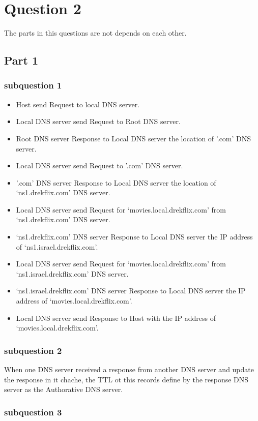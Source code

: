 \documentclass{article}
\begin{document}
\section{Question 2}
The parts in this questions are not depends on each other.
\subsection{Part 1}
\subsubsection{subquestion 1}
\begin{itemize}
    \item Host send Request to local DNS server.
    \item Local DNS server send Request to Root DNS server.
    \item Root DNS server Response to Local DNS server the location of '.com' DNS server.
    \item Local DNS server send Request to '.com' DNS server.
    \item '.com' DNS server Response to Local DNS server the location of `ns1.drekflix.com' DNS server.
    \item Local DNS server send Request for `movies.local.drekflix.com' from `ns1.drekflix.com' DNS server.
    \item `ns1.drekflix.com' DNS server Response to Local DNS server the IP address of `ns1.israel.drekflix.com'.
    \item Local DNS server send Request for `movies.local.drekflix.com' from `ns1.israel.drekflix.com' DNS server.
    \item `ns1.israel.drekflix.com' DNS server Response to Local DNS server the IP address of `movies.local.drekflix.com'.
    \item Local DNS server send Response to Host with the IP address of `movies.local.drekflix.com'.
\end{itemize}

\subsubsection{subquestion 2}
When one DNS server received a response from another DNS server and update the response in it chache, the TTL ot this records define by the response DNS server as the Authorative DNS server.
\subsubsection{subquestion 3}
\end{document}
